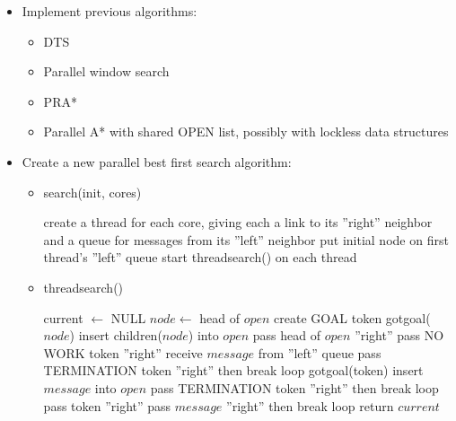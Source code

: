\documentclass{article}
\begin{document}
\begin{itemize}


\item Implement previous algorithms:
  \begin{itemize}
  \item DTS
  \item Parallel window search
  \item PRA*
  \item Parallel A* with shared OPEN list, possibly with lockless data structures
  \end{itemize}

\item Create a new parallel best first search algorithm:\\
  \begin{itemize}
  \item search(init, cores)
  \begin{algorithmic}[1]
  \STATE create a thread for each core, giving each a link to its ''right'' neighbor and a queue for messages from its ''left'' neighbor
  \STATE put initial node on first thread's ''left'' queue
  \STATE start threadsearch() on each thread
  \end{algorithmic}

  \item threadsearch()
  \begin{algorithmic}[1]
  \STATE current $\leftarrow$ NULL
  \LOOP
      \STATE $node \leftarrow$ head of $open$
        \STATE create GOAL token
        \STATE gotgoal($node$)
      \ELSE
        \STATE insert children($node$) into $open$
      \ENDIF
    \ENDFOR
      \STATE pass head of $open$ ''right''
    \ELSE
      \STATE pass NO WORK token ''right''
    \ENDIF
    \STATE receive $message$ from ''left'' queue
        \STATE pass TERMINATION token ''right'' then break loop
      \ELSE
        \STATE gotgoal(token)
      \ENDIF
      \STATE insert $message$ into $open$
        \STATE pass TERMINATION token ''right'' then break loop
        \STATE pass token ''right''
      \ENDIF
      \STATE pass $message$ ''right'' then break loop
    \ENDIF
  \ENDLOOP
  \STATE return $current$
  \end{algorithmic}


\end{itemize}
\end{itemize}
\end{document}
